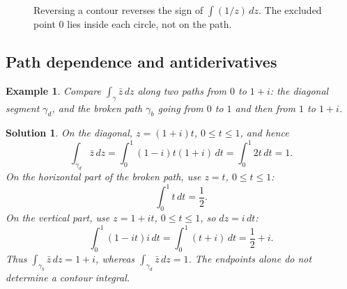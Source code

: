 \documentclass{report}
\newtheorem{example}{Example}
\newtheorem{solution}{Solution}
\begin{document}
\begin{figure}[H]
    \centering
    \caption{Reversing a contour reverses the sign of $\int (1/z)\,dz$.
    The excluded point $0$ lies inside each circle, not on the path.}
    \label{fig:integration-circle}
\end{figure}

\subsection{Path dependence and antiderivatives}

\begin{example}
    Compare $\displaystyle\int_\gamma\bar z\,dz$ along two paths from
    $0$ to $1+i$: the diagonal segment $\gamma_d$, and the broken path
    $\gamma_b$ going from $0$ to $1$ and then from $1$ to $1+i$.
\end{example}
\begin{solution}
    On the diagonal, $z=(1+i)t$, $0\leq t\leq1$, and hence
    \[
        \int_{\gamma_d}\bar z\,dz
        =\int_0^1 (1-i)t(1+i)\,dt
        =\int_0^1 2t\,dt=1.
    \]
    On the horizontal part of the broken path, use $z=t$, $0\leq t\leq1$:
    \[
        \int_0^1 t\,dt=\frac12.
    \]
    On the vertical part, use $z=1+it$, $0\leq t\leq1$, so $dz=i\,dt$:
    \[
        \int_0^1 (1-it)i\,dt
        =\int_0^1(t+i)\,dt=\frac12+i.
    \]
    Thus $\int_{\gamma_b}\bar z\,dz=1+i$, whereas
    $\int_{\gamma_d}\bar z\,dz=1$. The endpoints alone do not determine
    a contour integral.
\end{solution}
\end{document}
